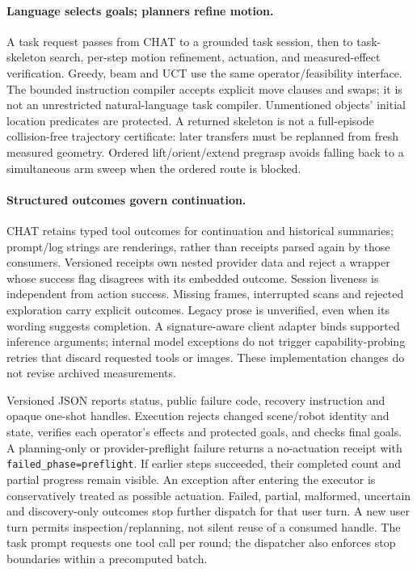 \paragraph{Language selects goals; planners refine motion.}
A task request passes from CHAT to a grounded task session, then to task-skeleton
search, per-step motion refinement, actuation, and measured-effect verification.
Greedy, beam and UCT use the same operator/feasibility interface. The bounded
instruction compiler accepts explicit move clauses and swaps; it is not an
unrestricted natural-language task compiler. Unmentioned objects' initial
location predicates are protected. A returned skeleton is not a full-episode
collision-free trajectory certificate: later transfers must be replanned from
fresh measured geometry. Ordered lift/orient/extend pregrasp avoids falling back
to a simultaneous arm sweep when the ordered route is blocked.

\paragraph{Structured outcomes govern continuation.}
CHAT retains typed tool outcomes for continuation and historical summaries;
prompt/log strings are renderings, rather than receipts parsed again by those
consumers. Versioned receipts own nested provider data and reject a wrapper
whose success flag disagrees with its embedded outcome. Session liveness is
independent from action success. Missing frames,
interrupted scans and rejected exploration carry explicit outcomes. Legacy prose
is unverified, even when its wording suggests completion. A signature-aware
client adapter binds supported inference arguments; internal model exceptions do
not trigger capability-probing retries that discard requested tools or images.
These implementation changes do not revise archived measurements.

Versioned JSON reports status, public failure code, recovery instruction and
opaque one-shot handles. Execution rejects changed scene/robot identity and
state, verifies each operator's effects and protected goals, and checks final
goals. A planning-only or provider-preflight failure returns a no-actuation
receipt with \texttt{failed\_phase=preflight}. If earlier steps succeeded, their
completed count and partial progress remain visible. An exception after entering
the executor is conservatively treated as possible actuation. Failed, partial,
malformed, uncertain and discovery-only outcomes stop further dispatch for that
user turn. A new user turn permits inspection/replanning, not silent reuse of a
consumed handle. The task prompt requests one tool call per round; the dispatcher
also enforces stop boundaries within a precomputed batch.

